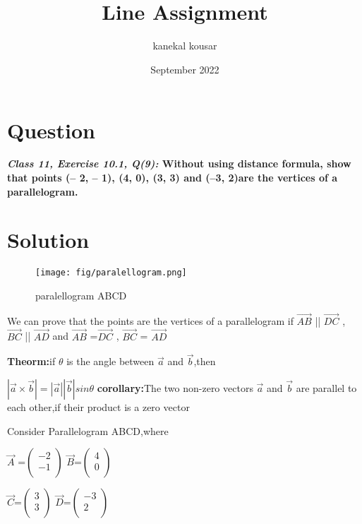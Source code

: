 \documentclass[journal,12pt,twocolumn]{IEEEtran}
\title{\textbf{\\Line Assignment}}
\author{kanekal kousar}
\date{September 2022}
\begin{document}
\maketitle


\section{Question}
\textbf{\textit{Class 11, Exercise 10.1, Q(9):} Without using distance formula, show that points (– 2, – 1), (4, 0), (3, 3) and (–3, 2)are the vertices of a parallelogram.}

\section{Solution}
\raggedright 

\begin{figure}[h!]
\centering
\texttt{[image: fig/paralellogram.png]} 
\caption{paralellogram ABCD}
\end{figure}

\vspace{0.25cm}
We can prove that the points are the vertices of a parallelogram if  \textbf{$\vec{AB}$} || \textbf{$\vec{DC}$} , \textbf{$\vec{BC}$} || \textbf{$\vec{AD}$} and  \textbf{$\vec{AB}$} =\textbf{$\vec{DC}$} , \textbf{$\vec{BC}$} = \textbf{$\vec{AD}$}
\vspace{0.3cm}

\textbf{Theorm:}if $\theta$ is the angle between $\vec{a}$ and $\vec{b}$,then

\hspace{3cm}
\boldmath
	$|\vec{a}\times \vec{b}|=|\vec{a}|| \vec{b}|sin\theta$
\unboldmath
\vspace{0.25cm}
\textbf{corollary:}The two non-zero vectors $\vec{a}$ and $\vec{b}$ are parallel to each other,if their product is a zero vector


Consider  Parallelogram ABCD,where

$ \vec{A}$ =$\begin{pmatrix}-2 \\ -1 \\ \end{pmatrix}$ \hspace{0.3cm} $ \vec{B} $=$\begin{pmatrix} 4\\ 0 \\ \end{pmatrix}$ 

$ \vec{C} $=$\begin{pmatrix}3 \\ 3 \\ \end{pmatrix}$ \hspace{0.3cm} $ \vec{D} $=$\begin{pmatrix}-3 \\ 2 \\ \end{pmatrix}$ 
\vspace{0.2cm}
\end{document}
